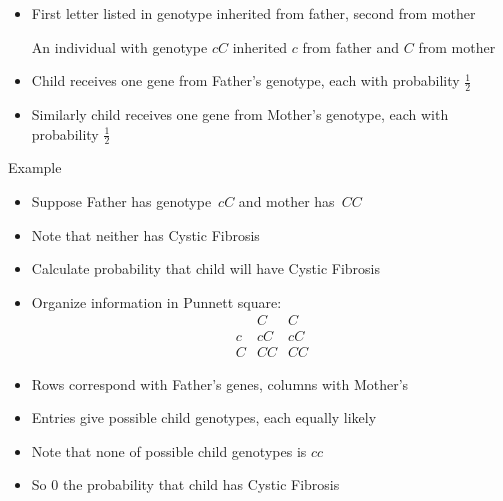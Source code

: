 \documentclass[handout]{beamer}
\theoremstyle{definition}
\begin{document}
\begin{frame}
\begin{itemize}
\item First letter listed in genotype
inherited from father, second from mother
\begin{example}
An individual with genotype $cC$ inherited
$c$ from father and $C$ from mother
\end{example}
\item Child receives one gene from Father's genotype,
each with probability $\frac{1}{2}$
\item Similarly child receives one gene from Mother's genotype,
each with probability $\frac{1}{2}$
\end{itemize}
\end{frame}

\begin{frame}{Example}
\begin{itemize}
\item Suppose Father has genotype~$cC$ and mother has~$CC$
\item Note that neither has Cystic Fibrosis
\item Calculate probability that child will have Cystic Fibrosis
\item Organize information in \alert{Punnett square}:
\[\begin{array}{c|cc}
&C&C\\\hline
c&cC&cC\\
C&CC&CC
\end{array}\]
\item Rows correspond with Father's genes, columns with Mother's
\item Entries give possible child genotypes, each equally likely
\item Note that \alert{none} of possible child genotypes is $cc$
\item So $0$ the probability that child has Cystic Fibrosis
\end{itemize}
\end{frame}
\end{document}
